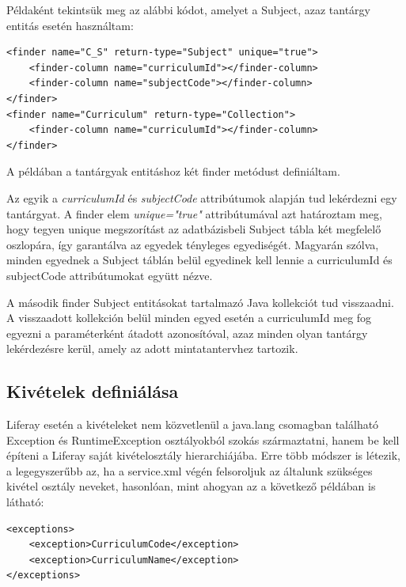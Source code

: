 \documentclass[hidelinks, 12pt, a4paper]{report}
\begin{document}
Példaként tekintsük meg az alábbi kódot, amelyet a Subject, azaz tantárgy entitás esetén használtam:

\begin{minipage}{\linewidth}
\begin{lstlisting}
<finder name="C_S" return-type="Subject" unique="true">
	<finder-column name="curriculumId"></finder-column>
	<finder-column name="subjectCode"></finder-column>
</finder>
<finder name="Curriculum" return-type="Collection">
	<finder-column name="curriculumId"></finder-column>
</finder>
\end{lstlisting}
\end{minipage}

A példában a tantárgyak entitáshoz két finder metódust definiáltam.

Az egyik a \emph{curriculumId} és \emph{subjectCode} attribútumok alapján tud lekérdezni egy tantárgyat. A finder elem \emph{unique="true"} attribútumával azt határoztam meg, hogy tegyen unique megszorítást az adatbázisbeli Subject tábla két megfelelő oszlopára, így garantálva az egyedek tényleges egyediségét. Magyarán szólva, minden egyednek a Subject táblán belül egyedinek kell lennie a curriculumId és subjectCode attribútumokat együtt nézve.

A második finder Subject entitásokat tartalmazó Java kollekciót tud visszaadni. A visszaadott kollekción belül minden egyed esetén a curriculumId meg fog egyezni a paraméterként átadott azonosítóval, azaz minden olyan tantárgy lekérdezésre kerül, amely az adott mintatantervhez tartozik.

\subsection{Kivételek definiálása}

Liferay esetén a kivételeket nem közvetlenül a java.lang csomagban található Exception és RuntimeException osztályokból szokás származtatni, hanem be kell építeni a Liferay saját kivételosztály hierarchiájába. Erre több módszer is létezik, a legegyszerűbb az, ha a service.xml végén felsoroljuk az általunk szükséges kivétel osztály neveket, hasonlóan, mint ahogyan az a következő példában is látható:

\begin{minipage}{\linewidth}
\begin{lstlisting}
<exceptions>
	<exception>CurriculumCode</exception>
	<exception>CurriculumName</exception>
</exceptions>
\end{lstlisting}
\end{minipage}
\end{document}
